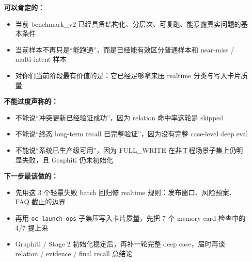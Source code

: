 \documentclass[11pt]{article}
\begin{document}
\textbf{可以肯定的：}
\begin{itemize}
\item 当前 benchmark\_v2 已经具备结构化、分层次、可复跑、能暴露真实问题的基本条件
\item 当前样本不再只是“能跑通”，而是已经能有效区分普通样本和 near-miss / multi-intent 样本
\item 对你们当前阶段最有价值的是：它已经足够拿来压 realtime 分类与写入卡片质量
\end{itemize}

\textbf{不能过度声称的：}
\begin{itemize}
\item 不能说“冲突更新已经验证成功”，因为 relation 命中率这轮是 skipped
\item 不能说“终态 long-term recall 已完整验证”，因为没有完整 case-level deep eval
\item 不能说“系统已生产级可用”，因为 FULL\_WRITE 在非工程场景子集上仍明显失败，且 Graphiti 仍未初始化
\end{itemize}

\textbf{下一步最该做的：}
\begin{itemize}
\item 先用这 3 个轻量失败 batch 回归修 realtime 规则：发布窗口、风险预案、FAQ 截止的边界
\item 再用 \texttt{oc\_launch\_ops} 子集压写入卡片质量，先把 7 个 memory card 检查中的 4/7 提上来
\item Graphiti / Stage 2 初始化稳定后，再补一轮完整 deep case，届时再谈 relation / evidence / final recall 总结论
\end{itemize}
\end{document}
